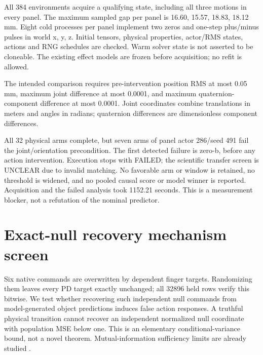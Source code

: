 \documentclass[10 pt]{article}
\begin{document}
All 384 environments acquire a qualifying state, including all three motions in
every panel. The maximum sampled gap per panel is 16.60, 15.57, 18.83, 18.12 mm.
Eight cold processes per panel implement two zeros and one-step plus/minus pulses
in world x, y, z. Initial tensors, physical properties, actor/RMS states, actions and
RNG schedules are checked. Warm solver state is not asserted to be cloneable.
The existing effect models are frozen before acquisition; no refit is allowed.

The intended comparison requires pre-intervention position RMS at most 0.05 mm,
maximum joint difference at most 0.0001, and maximum quaternion-component difference
at most 0.0001. Joint coordinates combine translations in meters and angles in
radians; quaternion differences are dimensionless component differences.

\begin{table}[h]
\centering

\caption{Maximum pre-intervention mismatch over arms relative to zero-a. Limits: position 0.05 mm; joint and quaternion components 0.0001.}
\end{table}

All 32 physical arms complete, but seven arms of panel actor 286/seed 491 fail the
joint/orientation precondition. The first detected failure is zero-b, before any
action intervention. Execution stops with FAILED; the scientific transfer screen
is UNCLEAR due to invalid matching. No favorable arm or window is retained, no
threshold is widened, and no pooled causal score or model winner is reported.
Acquisition and the failed analysis took 1152.21 seconds. This is a measurement
blocker, not a refutation of the nominal predictor.

\section{Exact-null recovery mechanism screen}
Six native commands are overwritten by dependent finger targets. Randomizing them
leaves every PD target exactly unchanged; all 32896 held rows verify this bitwise.
We test whether recovering such independent null commands from model-generated
object predictions induces false action responses. A truthful physical transition
cannot recover an independent normalized null coordinate with population MSE below
one. This is an elementary conditional-variance bound, not a novel theorem.
Mutual-information sufficiency limits are already studied \cite{rakelly2021}.
\end{document}
